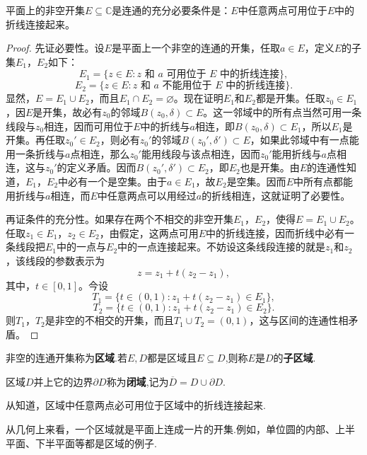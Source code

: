 \documentclass[../../main.tex]{subfiles}%
\begin{document}
\begin{theorem}\label{theorem:连通集合的性质}
平面上的非空开集\(E\subseteq \mathbb{C}\)是连通的充分必要条件是：\(E\)中任意两点可用位于\(E\)中的折线连接起来。
\end{theorem}
\begin{proof}

先证必要性。设\(E\)是平面上一个非空的连通的开集，任取\(a \in E\)，定义\(E\)的子集\(E_1\)，\(E_2\)如下：
\[
E_1 = \{ z \in E : z \text{ 和 } a \text{ 可用位于 } E \text{ 中的折线连接} \},
\]
\[
E_2 = \{ z \in E : z \text{ 和 } a \text{ 不能用位于 } E \text{ 中的折线连接} \}.
\]
显然，\(E = E_1 \cup E_2\)，而且\(E_1 \cap E_2 = \varnothing\)。现在证明\(E_1\)和\(E_2\)都是开集。任取\(z_0 \in E_1\)，因\(E\)是开集，故必有\(z_0\)的邻域\(B(z_0, \delta) \subset E\)。这一邻域中的所有点当然可用一条线段与\(z_0\)相连，因而可用位于\(E\)中的折线与\(a\)相连，即\(B(z_0, \delta) \subset E_1\)，所以\(E_1\)是开集。再任取\(z_0' \in E_2\)，则必有\(z_0'\)的邻域\(B(z_0', \delta') \subset E\)，如果此邻域中有一点能用一条折线与\(a\)点相连，那么\(z_0'\)能用线段与该点相连，因而\(z_0'\)能用折线与\(a\)点相连，这与\(z_0'\)的定义矛盾。因而\(B(z_0', \delta') \subset E_2\)，即\(E_2\)也是开集。由\(E\)的连通性知道，\(E_1\)，\(E_2\)中必有一个是空集。由于\(a \in E_1\)，故\(E_2\)是空集。因而\(E\)中所有点都能用折线与\(a\)相连，而\(E\)中任意两点可以用经过\(a\)的折线相连，这就证明了必要性。

再证条件的充分性。如果存在两个不相交的非空开集\(E_1\)，\(E_2\)，使得\(E = E_1 \cup E_2\)。任取\(z_1 \in E_1\)，\(z_2 \in E_2\)，由假定，这两点可用\(E\)中的折线连接，因而折线中必有一条线段把\(E_1\)中的一点与\(E_2\)中的一点连接起来。不妨设这条线段连接的就是\(z_1\)和\(z_2\)，该线段的参数表示为
\[
z = z_1 + t(z_2 - z_1),
\]
其中，\(t \in [0, 1]\)。今设
\[
T_1 = \{ t \in (0, 1) : z_1 + t(z_2 - z_1) \in E_1 \},
\]
\[
T_2 = \{ t \in (0, 1) : z_1 + t(z_2 - z_1) \in E_2 \}.
\]
则\(T_1\)，\(T_2\)是非空的不相交的开集，而且\(T_1 \cup T_2 = (0, 1)\)，这与区间的连通性相矛盾。 

\end{proof}

\begin{definition}[区域]
非空的连通开集称为\textbf{区域}.若$E,D$都是区域且$E\subseteq D$,则称$E$是$D$的\textbf{子区域}.

区域$D$并上它的边界$\partial D$称为\textbf{闭域},记为$\overline{D}=D\cup \partial D.$
\end{definition}
\begin{note}
从知道，区域中任意两点必可用位于区域中的折线连接起来.

从几何上来看，一个区域就是平面上连成一片的开集.例如，单位圆的内部、上半平面、下半平面等都是区域的例子.
\end{note}
\end{document}
